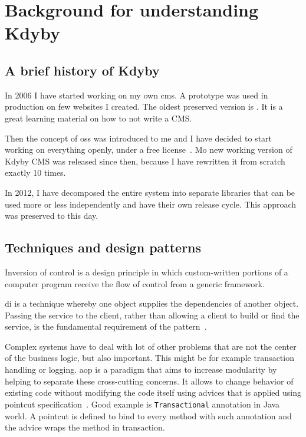 \chapter{Background for understanding Kdyby}

\section{A brief history of Kdyby} \label{sec:theory:kdyby-history}

In 2006 I have started working on my own \gls{cms}. A prototype was used in production on few websites I created. The oldest preserved version is . It is a great learning material on how to not write a CMS.

Then the concept of \gls{oss} was introduced to me and I have decided to start working on everything openly, under a free license~\cite{fsf:free-software}. Mo new working version of Kdyby CMS was released since then, because I have rewritten it from scratch exactly 10 times.

In 2012, I have decomposed the entire system into separate libraries that can be used more or less independently and have their own release cycle. This approach was preserved to this day.

\section{Techniques and design patterns}

 \label{sec:theory:di}

Inversion of control is a design principle in which custom-written portions of a computer program receive the flow of control from a generic framework.

\Gls{di} is a technique whereby one object supplies the dependencies of another object. Passing the service to the client, rather than allowing a client to build or find the service, is the fundamental requirement of the pattern~\cite{fowler:di}.

 \label{sec:theory:aop}

Complex systems have to deal with lot of other problems that are not the center of the business logic, but also important. This might be for example transaction handling or logging. \gls{aop} is a paradigm that aims to increase modularity by helping to separate these cross-cutting concerns. It allows to change behavior of existing code without modifying the code itself using advices that is applied using pointcut specification~\cite{kiczales1997aspect}. Good example is \lstinline{Transactional} annotation in Java world. A pointcut is defined to bind to every method with such annotation and the advice wraps the method in transaction.

